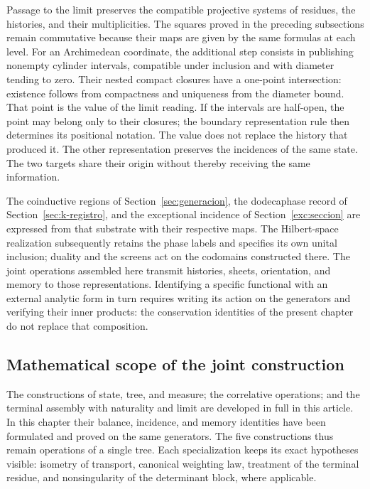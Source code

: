 Passage to the limit preserves the compatible projective systems of residues, the histories, and their multiplicities. The squares proved in the preceding subsections remain commutative because their maps are given by the same formulas at each level. For an Archimedean coordinate, the additional step consists in publishing nonempty cylinder intervals, compatible under inclusion and with diameter tending to zero. Their nested compact closures have a one-point intersection: existence follows from compactness and uniqueness from the diameter bound. That point is the value of the limit reading. If the intervals are half-open, the point may belong only to their closures; the boundary representation rule then determines its positional notation. The value does not replace the history that produced it. The other representation preserves the incidences of the same state. The two targets share their origin without thereby receiving the same information.

The coinductive regions of Section~\ref{sec:generacion}, the dodecaphase
record of Section~\ref{sec:k-registro}, and the exceptional incidence
of Section~\ref{exc:seccion} are expressed from that substrate with their
respective maps. The Hilbert-space realization subsequently retains the phase
labels and specifies its own unital inclusion; duality and the screens
act on the codomains constructed there. The joint operations assembled here
transmit histories, sheets, orientation, and memory to those
representations. Identifying a specific functional with an external analytic
form in turn requires writing its action on the generators and verifying
their inner products: the conservation identities of the present chapter
do not replace that composition.

\subsection{Mathematical scope of the joint construction}
The constructions of state, tree, and measure; the correlative operations; and
the terminal assembly with naturality and limit are developed in full
in this article. In this chapter their balance, incidence, and memory
identities have been formulated and proved on the same
generators. The five constructions thus remain operations of a
single tree. Each specialization keeps its exact hypotheses visible:
isometry of transport, canonical weighting law, treatment of the terminal
residue, and nonsingularity of the determinant block, where applicable.

